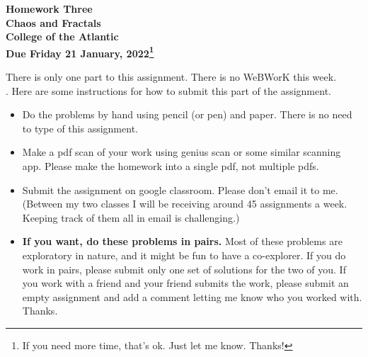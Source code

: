 \documentclass[12pt]{article}
\begin{document}
\pagestyle{empty}
 
\begin{center}
{\LARGE {\bf Homework Three}}\\
\bigskip
{\Large {\bf Chaos and Fractals}}\\
\bigskip
{\Large {\bf College of the Atlantic}}\\
\bigskip
{ {\bf Due Friday 21 January, 2022\footnote{If you need more time,
      that's ok. Just let me know. Thanks!}}}\\  
\end{center}
\medskip


\noindent There is only one part to this assignment. There is no
WeBWorK this week.\\ 


.  Here are some
instructions for how to submit this part of the assignment.
\begin{itemize}
\item Do the problems by hand using pencil (or pen) and paper.
  There is no need to type of this assignment.
\item Make a pdf scan of your work using genius scan or some
  similar scanning app.  Please make the homework into a single
  pdf, not multiple pdfs.
\item Submit the assignment on google classroom.  Please don't
  email it to me.  (Between my two classes I will be receiving
  around 45 assignments a week.  Keeping track of them all in email
  is challenging.)
\item {\bf If you want, do these problems in pairs.} Most of these
  problems are exploratory in nature, and it might be fun to have a
  co-explorer. If you do work in pairs,
  please submit only one set of solutions for the two of you.  If you
  work with a friend and your friend submits the work, please submit
  an empty assignment and add a comment letting me know who you worked
  with.  Thanks.
\end{itemize}
\end{document}

